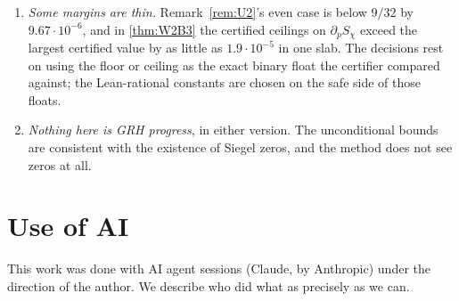 \documentclass[11pt]{article}
\theoremstyle{definition}
\begin{document}
\begin{enumerate}
\item \emph{Some margins are thin.} Remark~\ref{rem:U2}'s even case is below $9/32$ by $9.67\cdot10^{-6}$, and in \cref{thm:W2B3} the certified ceilings on $\partial_pS_\chi$ exceed the largest certified value by as little as $1.9\cdot10^{-5}$ in one slab. The decisions rest on using the floor or ceiling as the exact binary float the certifier compared against; the Lean-rational constants are chosen on the safe side of those floats.
\item \emph{Nothing here is GRH progress}, in either version. The unconditional bounds are consistent with the existence of Siegel zeros, and the method does not see zeros at all.
\end{enumerate}

\section{Use of AI}\label{sec:ai}

This work was done with AI agent sessions (Claude, by Anthropic) under the direction of the author. We describe who did what as precisely as we can.
\end{document}
